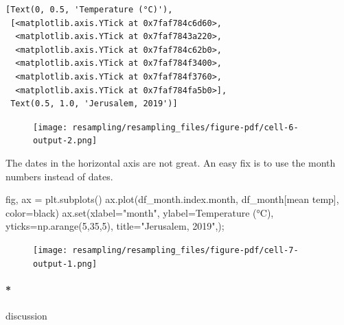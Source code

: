 \documentclass[
  letterpaper,
  DIV=11,
  numbers=noendperiod,
  oneside]{scrreprt}
\let\oldparagraph\paragraph
\renewcommand{\paragraph}[1]{\oldparagraph{#1}\mbox{}}
\newenvironment{Shaded}{\begin{snugshade}}{\end{snugshade}}
\newcommand{\BuiltInTok}[1]{\textcolor[rgb]{0.00,0.23,0.31}{#1}}
\newcommand{\DecValTok}[1]{\textcolor[rgb]{0.68,0.00,0.00}{#1}}
\newcommand{\NormalTok}[1]{\textcolor[rgb]{0.00,0.23,0.31}{#1}}
\newcommand{\OperatorTok}[1]{\textcolor[rgb]{0.37,0.37,0.37}{#1}}
\newcommand{\StringTok}[1]{\textcolor[rgb]{0.13,0.47,0.30}{#1}}
\begin{document}
\begin{verbatim}
[Text(0, 0.5, 'Temperature (°C)'),
 [<matplotlib.axis.YTick at 0x7faf784c6d60>,
  <matplotlib.axis.YTick at 0x7faf7843a220>,
  <matplotlib.axis.YTick at 0x7faf784c62b0>,
  <matplotlib.axis.YTick at 0x7faf784f3400>,
  <matplotlib.axis.YTick at 0x7faf784f3760>,
  <matplotlib.axis.YTick at 0x7faf784fa5b0>],
 Text(0.5, 1.0, 'Jerusalem, 2019')]
\end{verbatim}

\begin{figure}[H]

{\centering \texttt{[image: resampling/resampling\_files/figure-pdf/cell-6-output-2.png]}

}

\end{figure}

The dates in the horizontal axis are not great. An easy fix is to use
the month numbers instead of dates.

\begin{Shaded}
\begin{Highlighting}[]
\NormalTok{fig, ax }\OperatorTok{=}\NormalTok{ plt.subplots()}
\NormalTok{ax.plot(df\_month.index.month, df\_month[}\StringTok{\textquotesingle{}mean temp\textquotesingle{}}\NormalTok{], color}\OperatorTok{=}\StringTok{\textquotesingle{}black\textquotesingle{}}\NormalTok{)}
\NormalTok{ax.}\BuiltInTok{set}\NormalTok{(xlabel}\OperatorTok{=}\StringTok{"month"}\NormalTok{,}
\NormalTok{       ylabel}\OperatorTok{=}\StringTok{\textquotesingle{}Temperature (°C)\textquotesingle{}}\NormalTok{,}
\NormalTok{       yticks}\OperatorTok{=}\NormalTok{np.arange(}\DecValTok{5}\NormalTok{,}\DecValTok{35}\NormalTok{,}\DecValTok{5}\NormalTok{),}
\NormalTok{       title}\OperatorTok{=}\StringTok{"Jerusalem, 2019"}\NormalTok{,)}\OperatorTok{;}
\end{Highlighting}
\end{Shaded}

\begin{figure}[H]

{\centering \texttt{[image: resampling/resampling\_files/figure-pdf/cell-7-output-1.png]}

}

\end{figure}

\hypertarget{discussion-1}{%
\paragraph*{discussion}\label{discussion-1}}
\end{document}
